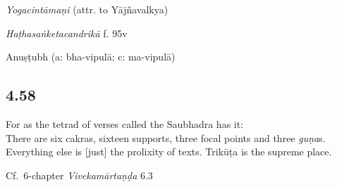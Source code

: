 \begin{ekdosis}
\begin{testimonia}[hp04_057]
\emph{Yogacintāmaṇi} (attr. to Yājñavalkya)
\begin{versinnote}
\end{versinnote}

\emph{Haṭhasaṅketacandrikā} f. 95v
\begin{versinnote}
\end{versinnote}
\end{testimonia}


\begin{metre}[hp04_057]
Anuṣṭubh (a: bha-vipulā; c: ma-vipulā)
\end{metre}

\subsection*{4.58}
\begin{translation}[hp04_058]
For as the tetrad of verses called the Saubhadra has it:\\
There are six cakras, sixteen supports, three focal points and three \emph{guṇa}s. Everything else is [just] the prolixity of texts. Trikūṭa is the supreme place.
\end{translation}


\begin{testimonia}[hp04_058]
Cf.~6-chapter \emph{Vivekamārtaṇḍa} 6.3
\begin{versinnote}
\end{versinnote}
\end{testimonia}


\end{ekdosis}
